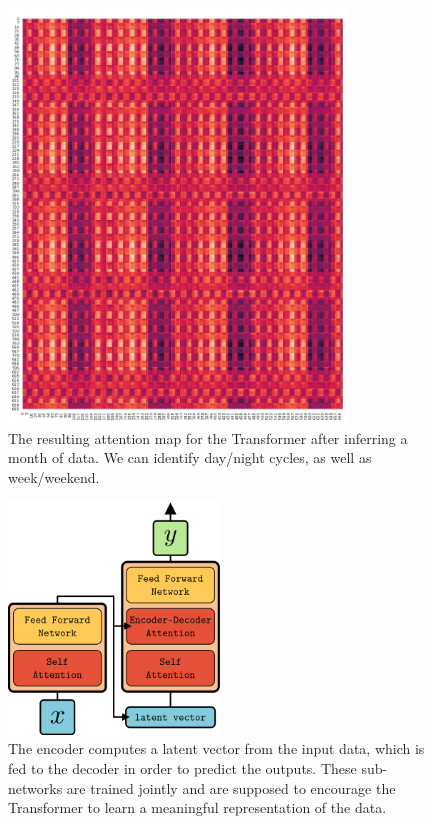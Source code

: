 \documentclass[12pt]{article}
\begin{document}
\begin{figure}
    \centering
    \includegraphics[width=0.8\textwidth]{illustration_attentionmap.jpg}
    \caption{The resulting attention map for the Transformer after inferring a month of data. We can identify day/night cycles, as well as week/weekend.}
    \label{fig:self_attention}
\end{figure}{}

\begin{figure}
    \centering
    \includegraphics[width=0.5\textwidth]{illustration_encoder_decoder.png}
    \caption{The encoder computes a latent vector from the input data, which is fed to the decoder in order to predict the outputs. These sub-networks are trained jointly and are supposed to encourage the Transformer to learn a meaningful representation of the data.}
    \label{fig:encoder_decoder}
\end{figure}{}
\end{document}

